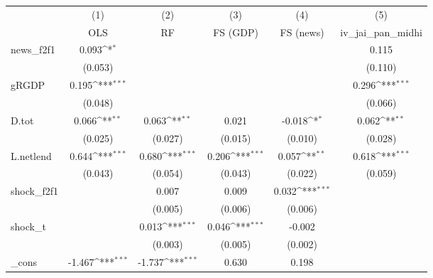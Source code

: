 {
\def\sym#1{\ifmmode^{#1}\else\(^{#1}\)\fi}
\begin{tabular}{l*{5}{c}}
\toprule
            &\multicolumn{1}{c}{(1)}&\multicolumn{1}{c}{(2)}&\multicolumn{1}{c}{(3)}&\multicolumn{1}{c}{(4)}&\multicolumn{1}{c}{(5)}\\
            &\multicolumn{1}{c}{OLS}&\multicolumn{1}{c}{RF}&\multicolumn{1}{c}{FS (GDP)}&\multicolumn{1}{c}{FS (news)}&\multicolumn{1}{c}{iv\_jai\_pan\_midhi}\\
\midrule
news\_f2f1   &       0.093\sym{*}  &                     &                     &                     &       0.115         \\
            &     (0.053)         &                     &                     &                     &     (0.110)         \\
\addlinespace
gRGDP       &       0.195\sym{***}&                     &                     &                     &       0.296\sym{***}\\
            &     (0.048)         &                     &                     &                     &     (0.066)         \\
\addlinespace
D.tot       &       0.066\sym{**} &       0.063\sym{**} &       0.021         &      -0.018\sym{*}  &       0.062\sym{**} \\
            &     (0.025)         &     (0.027)         &     (0.015)         &     (0.010)         &     (0.028)         \\
\addlinespace
L.netlend   &       0.644\sym{***}&       0.680\sym{***}&       0.206\sym{***}&       0.057\sym{**} &       0.618\sym{***}\\
            &     (0.043)         &     (0.054)         &     (0.043)         &     (0.022)         &     (0.059)         \\
\addlinespace
shock\_f2f1  &                     &       0.007         &       0.009         &       0.032\sym{***}&                     \\
            &                     &     (0.005)         &     (0.006)         &     (0.006)         &                     \\
\addlinespace
shock\_t     &                     &       0.013\sym{***}&       0.046\sym{***}&      -0.002         &                     \\
            &                     &     (0.003)         &     (0.005)         &     (0.002)         &                     \\
\addlinespace
\_cons      &      -1.467\sym{***}&      -1.737\sym{***}&       0.630         &       0.198         &                     \\

\end{tabular}}
